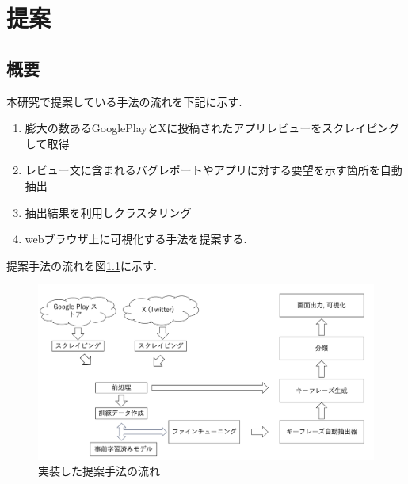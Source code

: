 \chapter{提案}
\label{chap:teian}


\section{概要}
本研究で提案している手法の流れを下記に示す. 

\begin{enumerate}
  \item 膨大の数あるGooglePlayとXに投稿されたアプリレビューをスクレイピングして取得
  \item レビュー文に含まれるバグレポートやアプリに対する要望を示す箇所を自動抽出
  \item 抽出結果を利用しクラスタリング
  \item webブラウザ上に可視化する手法を提案する. 
\end{enumerate}

提案手法の流れを図\ref{chap:nagare}に示す. 

\begin{figure}[hbtp]
  \centering
  \includegraphics[width=\linewidth]
       {contents/images/zisso_nagare.png}
  \caption{実装した提案手法の流れ\label{chap:nagare}}
\end{figure}


